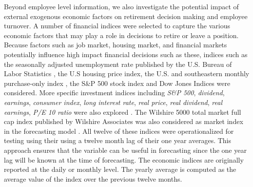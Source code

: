 \documentclass[12pt,letterpaper]{article}
\begin{document}
Beyond employee level information, we also investigate the potential impact of external exogenous economic factors on retirement decision making and employee turnover.  A number of financial indices were selected to capture the various economic factors that may play a role in decisions to retire or leave a position.  Because factors such as job market, housing market, and financial markets potentially influence high impact financial decisions such as these, indices such as the seasonally adjusted unemployment rate published by the U.S. Bureau of Labor Statistics \citep{unemployment}, the U.S housing price index, the U.S. and southeastern monthly purchase-only index \citep{HPI}, the S\&P 500 stock index and Dow Jones Indices were considered. More specific investment indices including {\it S\&P 500}, {\it dividend}, {\it earnings}, {\it consumer index}, {\it long interest rate}, {\it real price}, {\it real dividend}, {\it real earnings}, {\it P/E 10 ratio} were also explored \citep{sp500}. The Wilshire 5000 total market full cap index published by Wilshire Associates was also considered as market index in the forecasting model \citep{will5000}. All twelve of these indices were operationalized for testing using their using a twelve month lag of their one year averages.  This approach ensures that the variable can be useful in forecasting since the one year lag will be known at the time of forecasting.  The economic indices are originally reported at the daily or monthly level. The yearly average is computed as the average value of the index over the previous twelve months.

\end{document}
